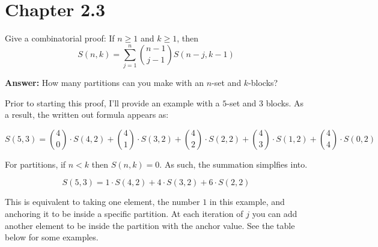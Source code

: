 \documentclass{article}
\begin{document}
\section{Chapter 2.3}
\setcounter{problem}{12}
\begin{problem} %
Give a combinatorial proof: If $n \ge 1$ and $k \ge 1$, then
\begin{equation*}
    S(n,k) = \sum_{j=1}^{n} \binom{n-1}{j-1} S(n-j, k-1)
\end{equation*}
\end{problem}

\textbf{Answer:}
How many partitions can you make with an $n$-set and $k$-blocks?

\medskip
Prior to starting this proof, I'll provide an example with a $5$-set and $3$ blocks. As a result, the written out formula appears as:

\begin{equation*}
    S(5, 3) = \binom{4}{0} \cdot S(4, 2) + \binom{4}{1} \cdot S(3, 2) + \binom{4}{2} \cdot S(2, 2) + \binom{4}{3} \cdot S(1, 2) + \binom{4}{4} \cdot S(0, 2)
\end{equation*}

For partitions, if $n <k$ then $S(n,k) = 0$. As such, the summation simplfies into.

\begin{equation*}
    S(5, 3) = 1 \cdot S(4, 2) + 4 \cdot S(3, 2) + 6 \cdot S(2, 2)
\end{equation*}

This is equivalent to taking one element, the number $1$ in this example, and anchoring it to be inside a specific partition. At each iteration of $j$ you can add another element to be inside the partition with the anchor value. See the table below for some examples.
\end{document}
